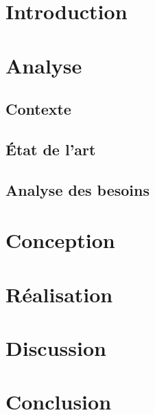 \documentclass{report}
\begin{document}
\tableofcontents

\newpage

\chapter{Introduction}

\chapter{Analyse}

\section{Contexte}
\section{État de l'art}
\section{Analyse des besoins}

\chapter{Conception}

\chapter{Réalisation}

\chapter{Discussion}

\chapter{Conclusion}
\end{document}
